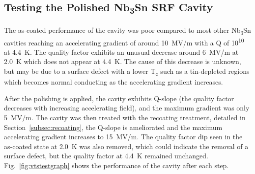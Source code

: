 \documentclass[reprint,amsmath,amssymb,aps]{revtex4-2}%
\begin{document}
%
\subsection{Testing the Polished Nb\textsubscript{3}Sn SRF Cavity}%
\label{subsec:cavityresults}%
The as-coated performance of the cavity was poor compared to most other Nb\textsubscript{3}Sn cavities reaching an accelerating gradient of around 10~MV/m with a Q of 10\textsuperscript{10} at 4.4~K. The quality factor exhibits an unusual decrease around 6~MV/m at 2.0~K which does not appear at 4.4~K. The cause of this decrease is unknown, but may be due to a surface defect with a lower T\textsubscript{c} such as a tin-depleted regions which becomes normal conducting as the accelerating gradient increases.

After the polishing is applied, the cavity exhibits Q-slope (the quality factor decreases with increasing accelerating field), and the maximum gradient was only 5~MV/m. The cavity was then treated with the recoating treatment, detailed in Section~\ref{subsec:recoating}, the Q-slope is ameliorated and the maximum accelerating gradient increases to 15~MV/m. The quality factor dip seen in the as-coated state at 2.0~K was also removed, which could indicate the removal of a surface defect, but the quality factor at 4.4~K remained unchanged. Fig.~\ref{fig:vtstestgraph} shows the performance of the cavity after each step.
%
\end{document}
